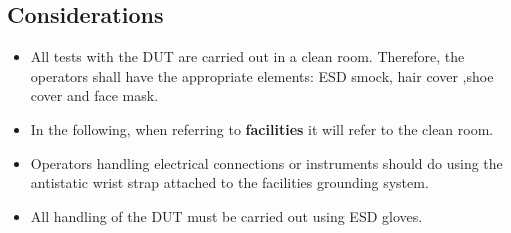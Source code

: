 \subsection{Considerations}

\begin{itemize}


\item All tests with the DUT are carried out in a clean room. Therefore, the operators shall have the appropriate elements: ESD smock, hair cover ,shoe cover and face mask.
\item In the following, when referring to \textbf{facilities} it will refer to the clean room.
\item Operators handling electrical connections or instruments should do using the
antistatic wrist strap attached to the facilities grounding system.
\item All handling of the DUT must be carried out using ESD gloves.





\end{itemize}
